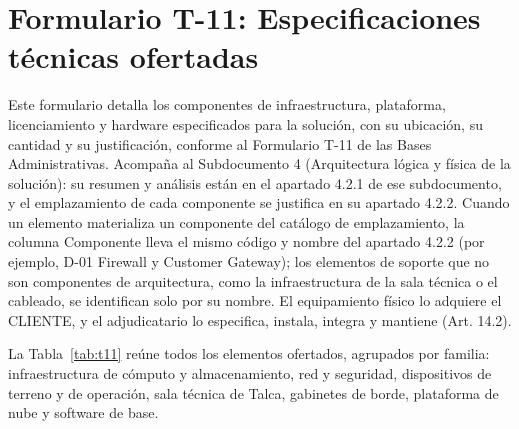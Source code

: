 
\chapter*{Formulario T-11: Especificaciones técnicas ofertadas}

Este formulario detalla los componentes de infraestructura, plataforma, licenciamiento y hardware especificados para la solución, con su ubicación, su cantidad y su justificación, conforme al Formulario T-11 de las Bases Administrativas. Acompaña al Subdocumento 4 (Arquitectura lógica y física de la solución): su resumen y análisis están en el apartado 4.2.1 de ese subdocumento, y el emplazamiento de cada componente se justifica en su apartado 4.2.2. Cuando un elemento materializa un componente del catálogo de emplazamiento, la columna Componente lleva el mismo código y nombre del apartado 4.2.2 (por ejemplo, D-01 Firewall y Customer Gateway); los elementos de soporte que no son componentes de arquitectura, como la infraestructura de la sala técnica o el cableado, se identifican solo por su nombre. El equipamiento físico lo adquiere el CLIENTE, y el adjudicatario lo especifica, instala, integra y mantiene (Art. 14.2).

La Tabla~\ref{tab:t11} reúne todos los elementos ofertados, agrupados por familia: infraestructura de cómputo y almacenamiento, red y seguridad, dispositivos de terreno y de operación, sala técnica de Talca, gabinetes de borde, plataforma de nube y software de base.

